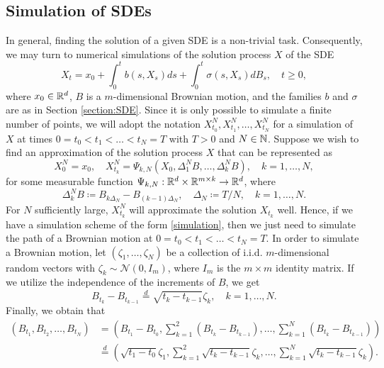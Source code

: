 \subsection{Simulation of SDEs}
In general, finding the solution of a given SDE is a non-trivial task. Consequently, we may turn to numerical simulations of the solution process $X$ of the SDE
\begin{equation}
    X_{t}=x_{0} + \int_{0}^{t}b(s,X_{s})ds + \int_{0}^{t}\sigma(s,X_{s})dB_{s}, \quad t\geq 0,
\end{equation}
where $x_{0}\in \mathbb{R}^{d}$, $B$ is a $m$-dimensional Brownian motion, and the families $b$ and $\sigma$ are as in Section \ref{section:SDE}. Since it is only possible to simulate a finite number of points, we will adopt the notation $X_{t_{0}}^{N},X_{t_{1}}^{N},\dots,X_{t_{N}}^{N}$ for a simulation of $X$ at times $0=t_{0}<t_{1}<\dots <t_{N}=T$ with $T>0$ and $N\in \mathbb{N}$. Suppose we wish to find an approximation of the solution process $X$ that can be represented as
\begin{equation}\label{simulation}
    X_{0}^{N}=x_{0},\quad X_{t_{k}}^{N}=\Psi_{k,N}(X_{0},\Delta_{1}^{N}B,\dots,\Delta_{k}^{N}B), \quad k=1,\dots,N,
\end{equation}
for some measurable function $\Psi_{k,N}:\mathbb{R}^{d}\times \mathbb{R}^{m\times k}\to \mathbb{R}^{d}$, where 
\begin{equation}
    \Delta_{k}^{N}B\coloneqq B_{k\Delta_{N}}-B_{(k-1)\Delta_{N}}, \quad \Delta_{N}\coloneqq T/N, \quad k=1,\dots, N.
\end{equation}
For $N$ sufficiently large, $X_{t_{k}}^{N}$ will approximate the solution $X_{t_{k}}$ well. Hence, if we have a simulation scheme of the form \eqref{simulation}, then we just need to simulate the path of a Brownian motion at $0=t_{0}<t_{1}<\dots<t_{N}=T$. In order to simulate a Brownian motion, let $(\zeta_{1},\dots,\zeta_{N})$ be a collection of i.i.d. $m$-dimensional random vectors with $\zeta_{k}\sim \mathcal{N}(0,I_{m})$, where $I_m$ is the $m\times m$ identity matrix. If we utilize the independence of the increments of $B$, we get
\begin{equation}
    B_{t_{k}}-B_{t_{k-1}}\overset{d}{=} \sqrt{t_{k}-t_{k-1}}\zeta_{k},\quad k=1,\dots,N.
\end{equation}
Finally, we obtain that
\begin{align}
    (B_{t_{1}},B_{t_{2}},\dots,B_{t_{N}})&= (B_{t_{1}}-B_{t_{0}}, \sum_{k=1}^{2}(B_{t_{k}}-B_{t_{k-1}}),\dots, \sum_{k=1}^{N}(B_{t_{k}}-B_{t_{k-1}}))\\
    &\overset{d}{=}(\sqrt{t_{1}-t_{0}}\zeta_{1},\sum_{k=1}^{2}\sqrt{t_{k}-t_{k-1}}\zeta_{k},\dots,\sum_{k=1}^{N}\sqrt{t_{k}-t_{k-1}}\zeta_{k}).
\end{align}
